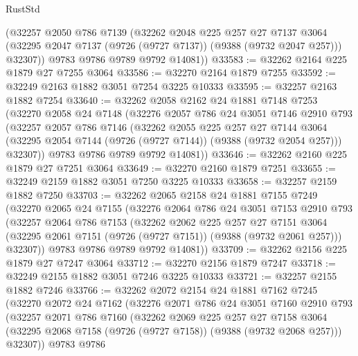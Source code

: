 \begin{lexlean}{RustStd}
\begin{coremodule}
        (@32257
          @2050
          @786
          @7139
          (@32262
            @2048
            @225
            @257
            @27
            @7137
            @3064
            (@32295 @2047 @7137 (@9726 (@9727 @7137)) (@9388 (@9732 @2047 @257)))
            @32307))
        @9783
        @9786
        @9789
        @9792
        @14081))
@33583 := @32262 @2164 @225 @1879 @27 @7255 @3064
@33586 := @32270 @2164 @1879 @7255
@33592 := @32249 @2163 @1882 @3051 @7254 @3225 @10333
@33595 := @32257 @2163 @1882 @7254
@33640 := @32262
    @2058
    @2162
    @24
    @1881
    @7148
    @7253
    (@32270
      @2058
      @24
      @7148
      (@32276
        @2057
        @786
        @24
        @3051
        @7146
        @2910
        @793
        (@32257
          @2057
          @786
          @7146
          (@32262
            @2055
            @225
            @257
            @27
            @7144
            @3064
            (@32295 @2054 @7144 (@9726 (@9727 @7144)) (@9388 (@9732 @2054 @257)))
            @32307))
        @9783
        @9786
        @9789
        @9792
        @14081))
@33646 := @32262 @2160 @225 @1879 @27 @7251 @3064
@33649 := @32270 @2160 @1879 @7251
@33655 := @32249 @2159 @1882 @3051 @7250 @3225 @10333
@33658 := @32257 @2159 @1882 @7250
@33703 := @32262
    @2065
    @2158
    @24
    @1881
    @7155
    @7249
    (@32270
      @2065
      @24
      @7155
      (@32276
        @2064
        @786
        @24
        @3051
        @7153
        @2910
        @793
        (@32257
          @2064
          @786
          @7153
          (@32262
            @2062
            @225
            @257
            @27
            @7151
            @3064
            (@32295 @2061 @7151 (@9726 (@9727 @7151)) (@9388 (@9732 @2061 @257)))
            @32307))
        @9783
        @9786
        @9789
        @9792
        @14081))
@33709 := @32262 @2156 @225 @1879 @27 @7247 @3064
@33712 := @32270 @2156 @1879 @7247
@33718 := @32249 @2155 @1882 @3051 @7246 @3225 @10333
@33721 := @32257 @2155 @1882 @7246
@33766 := @32262
    @2072
    @2154
    @24
    @1881
    @7162
    @7245
    (@32270
      @2072
      @24
      @7162
      (@32276
        @2071
        @786
        @24
        @3051
        @7160
        @2910
        @793
        (@32257
          @2071
          @786
          @7160
          (@32262
            @2069
            @225
            @257
            @27
            @7158
            @3064
            (@32295 @2068 @7158 (@9726 (@9727 @7158)) (@9388 (@9732 @2068 @257)))
            @32307))
        @9783
        @9786

\end{coremodule}
\end{lexlean}
